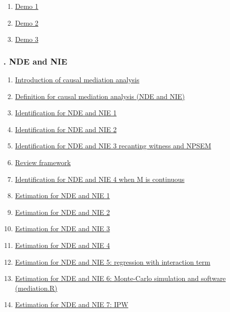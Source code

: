 \documentclass[11pt]{article}
\begin{document}
\begin{multicols}{3}
	\begin{enumerate}
		\item \href{https://mp.weixin.qq.com/s/6GagqDA5KoD1ITFghalsHA}{Demo 1}	%
		\item \href{https://mp.weixin.qq.com/s/gW1Ho58AGP0manJkTh7uRw}{Demo 2}	%
		\item \href{https://mp.weixin.qq.com/s/nc8LYP3OUiwaeXKXUIL3GA}{Demo 3}	%
	\end{enumerate}
\end{multicols}



\vspace{-1cm}

\subsubsection*{. NDE and NIE}

\vspace{-0.5cm}

\begin{enumerate}
	\item \href{https://mp.weixin.qq.com/s/Cw1v-UKBb9yigKF8q-yidg}{Introduction of causal mediation analysis}	%
	\item \href{https://mp.weixin.qq.com/s/F8WKmhrzXEyyiVd54RqZqA}{Definition for causal mediation analysis (NDE and NIE)}	%
	\item \href{https://mp.weixin.qq.com/s/DZnhE-gtiEh2iP0C9JmxeA}{Identification for NDE and NIE 1}	%
	\item \href{https://mp.weixin.qq.com/s/oXRnkyD_0JK9tQuipgnOWw}{Identification for NDE and NIE 2}	%
	\item \href{https://mp.weixin.qq.com/s/s5yrgAO913wcXmhOg-ysoQ}{Identification for NDE and NIE 3 recanting witness and NPSEM}	%
	\item \href{https://mp.weixin.qq.com/s/98U94FvD3D1oHK-HbdttPA}{Review framework}	%
	\item \href{https://mp.weixin.qq.com/s/UWTRO0gSPiswEDsIxtvPsA}{Identification for NDE and NIE 4 when M is continuous}	%
	\item \href{https://mp.weixin.qq.com/s/vBVU-ppWwzmZyUKgg0Kl4w}{Estimation for NDE and NIE 1}	%
	\item \href{https://mp.weixin.qq.com/s/bt0p9SKevVP9M4avaJctPw}{Estimation for NDE and NIE 2}	%
	\item \href{https://mp.weixin.qq.com/s/vAWnR_0fuI1AOJ0KQ_isTA}{Estimation for NDE and NIE 3}	%
	\item \href{https://mp.weixin.qq.com/s/SnOdeYG1GWulNHkrp1feCQ}{Estimation for NDE and NIE 4}	%
	\item \href{https://mp.weixin.qq.com/s/dEhVZrK9HF6A-c2Vxw5DTw}{Estimation for NDE and NIE 5: regression with interaction term}	%
	\item \href{https://mp.weixin.qq.com/s/Ryw632CtN_UNRRkzaYOXxw}{Estimation for NDE and NIE 6: Monte-Carlo simulation and software (mediation.R)}	%
	\item \href{https://mp.weixin.qq.com/s/-g18ym1rwA9dcfN4E0WEcg}{Estimation for NDE and NIE 7: IPW}	%
\end{enumerate}
\end{document}
